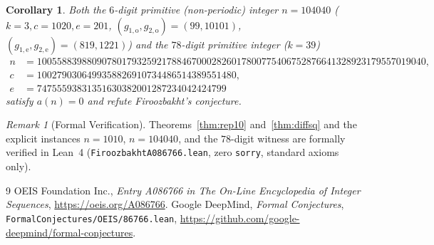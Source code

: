 \documentclass[11pt]{article}
\newtheorem{corollary}[theorem]{Corollary}
\theoremstyle{remark}
\newtheorem{remark}[theorem]{Remark}
\begin{document}
\begin{corollary}
Both the $6$-digit primitive (non-periodic) integer $n = 104040$ ($k = 3, c = 1020, e = 201$, $(g_{1,\mathrm{o}}, g_{2,\mathrm{o}}) = (99, 10101)$, $(g_{1,\mathrm{e}}, g_{2,\mathrm{e}}) = (819, 1221)$) and the $78$-digit primitive integer ($k = 39$)
\begin{align*}
  n &= 100558839880907801793259217884670002826017800775406752876641328923179557019040, \\
  c &= 1002790306499358826910734486514389551480, \\
  e &= 74755593831351630382001287234042424799
\end{align*}
satisfy $a(n) = 0$ and refute Firoozbakht's conjecture.
\end{corollary}

\begin{remark}[Formal Verification]
Theorems~\ref{thm:rep10} and~\ref{thm:diffsq} and the explicit instances $n = 1010$, $n = 104040$, and the $78$-digit witness are formally verified in Lean~4 (\texttt{FiroozbakhtA086766.lean}, zero \texttt{sorry}, standard axioms only).
\end{remark}

\begin{thebibliography}{9}
OEIS Foundation Inc., \emph{Entry A086766 in The On-Line Encyclopedia of Integer Sequences}, \url{https://oeis.org/A086766}.
Google DeepMind, \emph{Formal Conjectures}, \texttt{FormalConjectures/OEIS/86766.lean}, \url{https://github.com/google-deepmind/formal-conjectures}.
\end{thebibliography}
\end{document}
